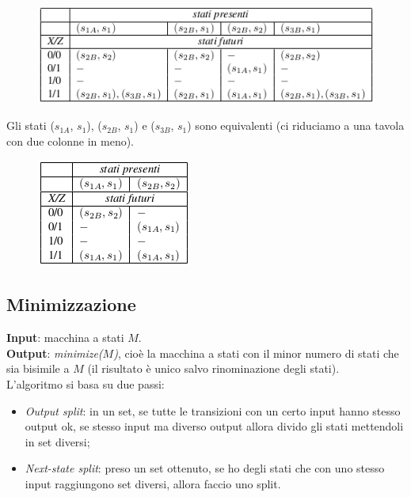 \documentclass[a4paper, notitlepage, 10pt]{report}
\begin{document}
\begin{multicols}{2}
\begin{figure}[H]
	\centering
	\includegraphics[scale=0.40]{DetNFA2}
\end{figure}
\columnbreak
\begin{multicols}{2}
	\noindent
	Gli stati ($s_{1A}$, $s_1$), ($s_{2B}$, $s_1$) e ($s_{3B}$, $s_1$) sono equivalenti (ci riduciamo a una tavola con due colonne in meno).
	\columnbreak
\begin{figure}[H]
	\centering
	\includegraphics[scale=0.40]{DetNFA3}
\end{figure}
\end{multicols}
\end{multicols}


\subsection*{Minimizzazione}
\textbf{Input}: macchina a stati $M$.\\
\textbf{Output}: \textit{minimize($M$)}, cioè la macchina a stati con il minor numero di stati che sia bisimile a $M$ (il risultato è unico salvo rinominazione degli stati).\\
L'algoritmo si basa su due passi:
\begin{itemize}
	\item \textit{Output split}: in un set, se tutte le transizioni con un certo input hanno stesso output ok, se stesso input ma diverso output allora divido gli stati mettendoli in set diversi;
	\item \textit{Next-state split}: preso un set ottenuto, se ho degli stati che con uno stesso input raggiungono set diversi, allora faccio uno split.
\end{itemize}
\end{document}
